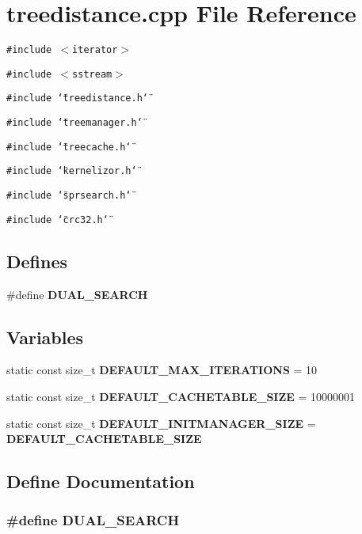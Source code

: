 \section{treedistance.cpp File Reference}
\label{treedistance_8cpp}
{\tt \#include $<$iterator$>$}\par
{\tt \#include $<$sstream$>$}\par
{\tt \#include \char`\"{}treedistance.h\char`\"{}}\par
{\tt \#include \char`\"{}treemanager.h\char`\"{}}\par
{\tt \#include \char`\"{}treecache.h\char`\"{}}\par
{\tt \#include \char`\"{}kernelizor.h\char`\"{}}\par
{\tt \#include \char`\"{}sprsearch.h\char`\"{}}\par
{\tt \#include \char`\"{}crc32.h\char`\"{}}\par
\subsection*{Defines}
\begin{CompactItemize}
\item 
\#define {\bf DUAL\_\-SEARCH}
\end{CompactItemize}
\subsection*{Variables}
\begin{CompactItemize}
\item 
static const size\_\-t {\bf DEFAULT\_\-MAX\_\-ITERATIONS} = 10
\item 
static const size\_\-t {\bf DEFAULT\_\-CACHETABLE\_\-SIZE} = 10000001
\item 
static const size\_\-t {\bf DEFAULT\_\-INITMANAGER\_\-SIZE} = {\bf DEFAULT\_\-CACHETABLE\_\-SIZE}
\end{CompactItemize}


\subsection{Define Documentation}
\subsubsection{\setlength{\rightskip}{0pt plus 5cm}\#define DUAL\_\-SEARCH}\label{treedistance_8cpp_a0}




